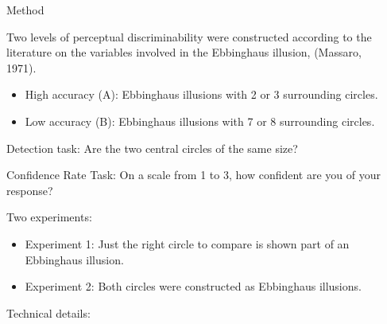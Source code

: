 \documentclass[final]{beamer}
\newlength{\sepwid}
\newlength{\onecolwid}
\newlength{\twocolwid}
\begin{document}
\begin{frame}[t]
\begin{columns}[t]
\begin{column}{\sepwid}\end{column} %

\begin{column}{\twocolwid} %

\begin{columns}[t,totalwidth=\twocolwid] %

\begin{column}{\onecolwid}\vspace{-.6in} %


\begin{block}{Method}

Two levels of perceptual discriminability were constructed according to the literature on the variables involved in the Ebbinghaus illusion, (Massaro, 1971).




\begin{itemize}
\item High accuracy (A): Ebbinghaus illusions with 2 or 3 surrounding circles.
\item Low accuracy (B): Ebbinghaus illusions with 7 or 8 surrounding circles.
\end{itemize}



Detection task:  Are the two central circles of the same size?


Confidence Rate Task:  On a scale from 1 to 3, how confident are you of your response?


Two experiments: 

\begin{itemize}
\item Experiment 1: Just the right circle to compare is shown part of an Ebbinghaus illusion.
\item Experiment 2: Both circles were constructed as Ebbinghaus illusions.
\end{itemize}



Technical details: 


\end{block}
\end{column}
\end{columns}
\end{column}
\end{columns}
\end{frame}
\end{document}
